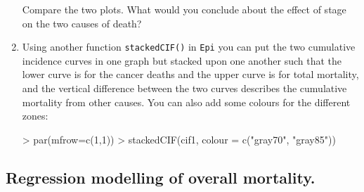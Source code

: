 \begin{enumerate}
Compare the two plots. What would you conclude about the
effect of stage on the two causes of death?

\item 
Using another function \texttt{stackedCIF()} in \texttt{Epi} you can 
put the two cumulative incidence curves in one graph but stacked upon one another such that
the lower curve is for the cancer deaths and the upper curve is for total mortality,
and the vertical difference between the two curves describes the
cumulative mortality from other causes. You can also add some colours for the different zones: 
\begin{Schunk}
\begin{Sinput}
> par(mfrow=c(1,1))
> stackedCIF(cif1, colour = c("gray70", "gray85"))
\end{Sinput}
\end{Schunk}


\end{enumerate}

\subsection{Regression modelling of overall mortality.}

